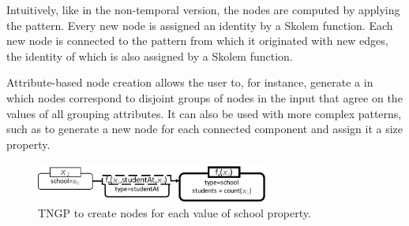 Intuitively, like in the non-temporal version, the nodes are computed
by applying the pattern.  Every new node is assigned an identity by a
Skolem function.  Each new node is connected to the pattern from which
it originated with new edges, the identity of which is also assigned
by a Skolem function.

Attribute-based node creation allows the user to, for instance,
generate a \tg in which nodes correspond to disjoint groups of nodes
in the input that agree on the values of all grouping attributes.  It
can also be used with more complex patterns, such as to generate a new
node for each connected component and assign it a size property.

\begin{figure}
\centering
\includegraphics[width=3in]{figs/schoolncr.pdf}
\caption{TNGP to create nodes for each value of school property.}
\vspace{-0.2cm}
\label{fig:schoolncr}
\vspace{-0.2cm}
\end{figure}

